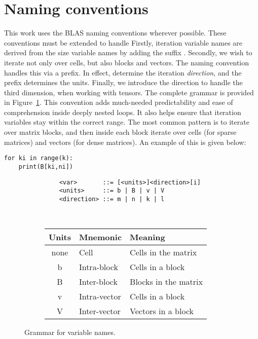 \section{Naming conventions}

This work uses the BLAS naming conventions wherever possible. These conventions must be extended to handle 
Firstly, iteration variable names are derived from the size variable names by adding the suffix . Secondly, we wish to iterate not only over cells, but also blocks and vectors. The naming convention handles this via a prefix. In effect,  determine the iteration \emph{direction}, and the prefix determines the units. Finally, we introduce the direction  to handle the third dimension, when working with tensors. The complete grammar is provided in Figure~\ref{fig:grammar}. This convention adds much-needed predictability and ease of comprehension inside deeply nested loops. It also helps ensure that iteration variables stay within the correct range. The most common pattern is to iterate over matrix blocks, and then inside each block iterate over cells (for sparse matrices) and vectors (for dense matrices). An example of this is given below:

\begin{verbatim}
for ki in range(k):
	print(B[ki,ni])
\end{verbatim}

\begin{figure}[tbh]
  \centering
  \begin{subfigure}[l]{0.48\textwidth}
      \begin{verbatim}
    <var>       ::= [<units>]<direction>[i]
    <units>     ::= b | B | v | V
    <direction> ::= m | n | k | l
  \end{verbatim}
  \end{subfigure}
  ~~~~
  \begin{subfigure}[r]{0.45\textwidth}
    \centering
    \begin{tabular}{cll}
		\toprule
		Units    & Mnemonic & Meaning \\
		\midrule

		none  & Cell          & Cells in the matrix      \\
		b     & Intra-block   & Cells in a block         \\
		B     & Inter-block   & Blocks in the matrix     \\
		v     & Intra-vector  & Cells in a block         \\
		V     & Inter-vector  & Vectors in a block       \\
		\bottomrule
	\end{tabular}
  \end{subfigure}
  \caption{Grammar for variable names.}
  \label{fig:grammar}
\end{figure}
